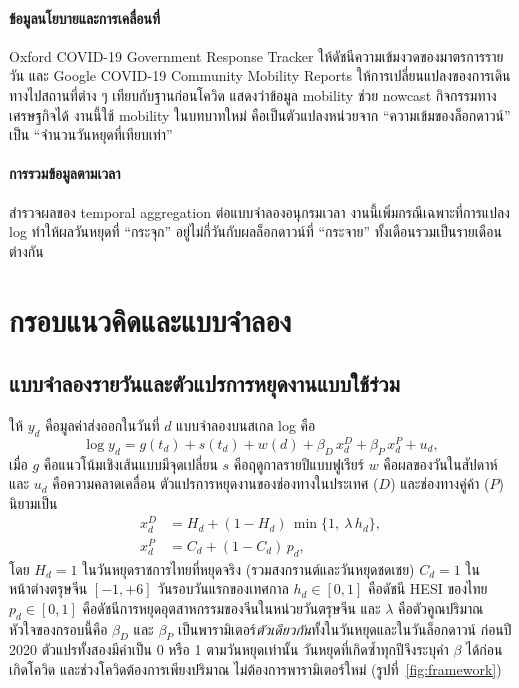 \documentclass{article}
\theoremstyle{definition}
\begin{document}
\paragraph{ข้อมูลนโยบายและการเคลื่อนที่}
Oxford COVID-19 Government Response Tracker \citep{hale2021oxcgrt} ให้ดัชนีความเข้มงวดของมาตรการรายวัน และ Google COVID-19 Community Mobility Reports \citep{google2022mobility} ให้การเปลี่ยนแปลงของการเดินทางไปสถานที่ต่าง ๆ เทียบกับฐานก่อนโควิด \citet{sampi2020nowcasting} แสดงว่าข้อมูล mobility ช่วย nowcast กิจกรรมทางเศรษฐกิจได้ งานนี้ใช้ mobility ในบทบาทใหม่ คือเป็นตัวแปลงหน่วยจาก “ความเข้มของล็อกดาวน์” เป็น “จำนวนวันหยุดที่เทียบเท่า”

\paragraph{การรวมข้อมูลตามเวลา}
\citet{silvestrini2008aggregation} สำรวจผลของ temporal aggregation ต่อแบบจำลองอนุกรมเวลา งานนี้เพิ่มกรณีเฉพาะที่การแปลง log ทำให้ผลวันหยุดที่ “กระจุก” อยู่ไม่กี่วันกับผลล็อกดาวน์ที่ “กระจาย” ทั้งเดือนรวมเป็นรายเดือนต่างกัน

\section{กรอบแนวคิดและแบบจำลอง}
\subsection{แบบจำลองรายวันและตัวแปรการหยุดงานแบบใช้ร่วม}
ให้ $y_d$ คือมูลค่าส่งออกในวันที่ $d$ แบบจำลองบนสเกล log คือ
\begin{equation}\label{eq:daily}
\log y_d = g(t_d) + s(t_d) + w(d) + \beta_D\,x^D_d + \beta_P\,x^P_d + u_d ,
\end{equation}
เมื่อ $g$ คือแนวโน้มเชิงเส้นแบบมีจุดเปลี่ยน $s$ คือฤดูกาลรายปีแบบฟูเรียร์ $w$ คือผลของวันในสัปดาห์ และ $u_d$ คือความคลาดเคลื่อน ตัวแปรการหยุดงานของช่องทางในประเทศ ($D$) และช่องทางคู่ค้า ($P$) นิยามเป็น
\begin{align}
x^D_d &= H_d + (1-H_d)\,\min\{1,\ \lambda\,h_d\}, \label{eq:xd}\\
x^P_d &= C_d + (1-C_d)\,p_d , \label{eq:xp}
\end{align}
โดย $H_d=1$ ในวันหยุดราชการไทยที่หยุดจริง (รวมสงกรานต์และวันหยุดชดเชย) $C_d=1$ ในหน้าต่างตรุษจีน $[-1,+6]$ วันรอบวันแรกของเทศกาล $h_d\in[0,1]$ คือดัชนี HESI ของไทย $p_d\in[0,1]$ คือดัชนีการหยุดอุตสาหกรรมของจีนในหน่วยวันตรุษจีน และ $\lambda$ คือตัวคูณปริมาณ หัวใจของกรอบนี้คือ $\beta_D$ และ $\beta_P$ เป็นพารามิเตอร์\emph{ตัวเดียวกัน}ทั้งในวันหยุดและในวันล็อกดาวน์ ก่อนปี 2020 ตัวแปรทั้งสองมีค่าเป็น 0 หรือ 1 ตามวันหยุดเท่านั้น วันหยุดที่เกิดซ้ำทุกปีจึงระบุค่า $\beta$ ได้ก่อนเกิดโควิด และช่วงโควิดต้องการเพียงปริมาณ ไม่ต้องการพารามิเตอร์ใหม่ (รูปที่~\ref{fig:framework})
\end{document}
